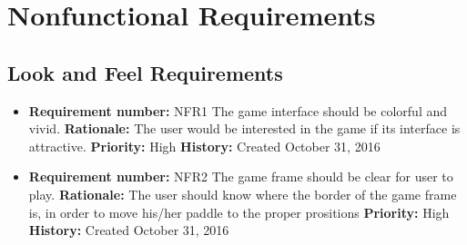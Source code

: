 \documentclass[12pt,letterpaper]{article}
\begin{document}
\section{Nonfunctional Requirements}
\subsection{Look and Feel Requirements}
\begin{reqbox}
	\begin{itemize}
	\item \textbf{Requirement number: }NFR1
		The game interface should be colorful and vivid.
		\textbf{Rationale: } The user would be interested in the game if its interface is attractive.
		\textbf{Priority: }High
		\textbf{History: }Created October 31, 2016
	
		\item \textbf{Requirement number: }NFR2
		The game frame should be clear for user to play.
		\textbf{Rationale: } The user should know where the border of the game frame is, in order to move his/her paddle to the proper prositions
		\textbf{Priority: }High
		\textbf{History: }Created October 31, 2016
	\end{itemize}
\end{reqbox}
\end{document}
